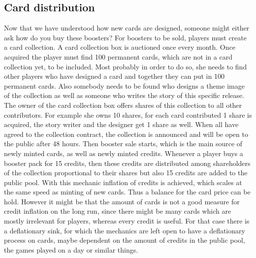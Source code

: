 \documentclass{article}
\begin{document}
\subsection{Card distribution}
%
Now that we have understood how new cards are designed, someone might either ask how do you buy these boosters? For boosters to be sold, players must create a card collection. A card collection box is auctioned once every month. Once acquired the player must find 100 permanent cards, which are not in a card collection yet, to be included. Most probably in order to do so, she needs to find other players who have designed a card and together they can put in 100 permanent cards. Also somebody needs to be found who designs a theme image of the collection as well as someone who writes the story of this specific release. The owner of the card collection box offers shares of this collection to all other contributors. For example she owns 10 shares, for each card contributed 1 share is acquired, the story writer and the designer get 1 share as well. When all have agreed to the collection contract, the collection is announced and will be open to the public after 48 hours. Then booster sale starts, which is the main source of newly minted cards, as well as newly minted credits. Whenever a player buys a booster pack for 15 credits, then these credits are distributed among shareholders of the collection proportional to their shares but also 15 credits are added to the public pool. With this mechanic inflation of credits is achieved, which scales at the same speed as minting of new cards. Thus a balance for the card price can be hold. However it might be that the amount of cards is not a good measure for credit inflation on the long run, since there might be many cards which are mostly irrelevant for players, whereas every credit is useful. For that case there is a deflationary sink, for which the mechanics are left open to have a deflationary process on cards, maybe dependent on the amount of credits in the public pool, the games played on a day or similar things.
%
\end{document}
